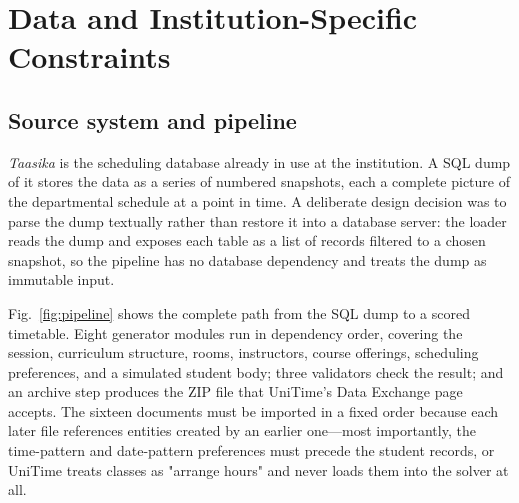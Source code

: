 \documentclass[journal]{IEEEtran}
\begin{document}
\section{Data and Institution-Specific Constraints}
\label{sec:data}

\subsection{Source system and pipeline}
\emph{Taasika} is the scheduling database already in use at the institution. A SQL dump of it stores the data as a series of numbered snapshots, each a complete picture of the departmental schedule at a point in time. A deliberate design decision was to parse the dump textually rather than restore it into a database server: the loader reads the dump and exposes each table as a list of records filtered to a chosen snapshot, so the pipeline has no database dependency and treats the dump as immutable input.

Fig.~\ref{fig:pipeline} shows the complete path from the SQL dump to a scored timetable. Eight generator modules run in dependency order, covering the session, curriculum structure, rooms, instructors, course offerings, scheduling preferences, and a simulated student body; three validators check the result; and an archive step produces the ZIP file that UniTime's Data Exchange page accepts. The sixteen documents must be imported in a fixed order because each later file references entities created by an earlier one---most importantly, the time-pattern and date-pattern preferences must precede the student records, or UniTime treats classes as "arrange hours" and never loads them into the solver at all.
\end{document}
